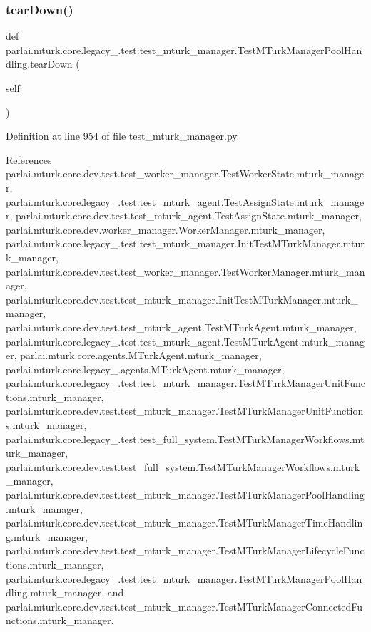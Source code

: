\subsubsection{\texorpdfstring{tear\+Down()}{tearDown()}}
{\footnotesize\ttfamily def parlai.\+mturk.\+core.\+legacy\+\_.\+test.\+test\+\_\+mturk\+\_\+manager.\+Test\+M\+Turk\+Manager\+Pool\+Handling.\+tear\+Down (\begin{DoxyParamCaption}\item[{}]{self }\end{DoxyParamCaption})}



Definition at line 954 of file test\+\_\+mturk\+\_\+manager.\+py.



References parlai.\+mturk.\+core.\+dev.\+test.\+test\+\_\+worker\+\_\+manager.\+Test\+Worker\+State.\+mturk\+\_\+manager, parlai.\+mturk.\+core.\+legacy\+\_.\+test.\+test\+\_\+mturk\+\_\+agent.\+Test\+Assign\+State.\+mturk\+\_\+manager, parlai.\+mturk.\+core.\+dev.\+test.\+test\+\_\+mturk\+\_\+agent.\+Test\+Assign\+State.\+mturk\+\_\+manager, parlai.\+mturk.\+core.\+dev.\+worker\+\_\+manager.\+Worker\+Manager.\+mturk\+\_\+manager, parlai.\+mturk.\+core.\+legacy\+\_.\+test.\+test\+\_\+mturk\+\_\+manager.\+Init\+Test\+M\+Turk\+Manager.\+mturk\+\_\+manager, parlai.\+mturk.\+core.\+dev.\+test.\+test\+\_\+worker\+\_\+manager.\+Test\+Worker\+Manager.\+mturk\+\_\+manager, parlai.\+mturk.\+core.\+dev.\+test.\+test\+\_\+mturk\+\_\+manager.\+Init\+Test\+M\+Turk\+Manager.\+mturk\+\_\+manager, parlai.\+mturk.\+core.\+dev.\+test.\+test\+\_\+mturk\+\_\+agent.\+Test\+M\+Turk\+Agent.\+mturk\+\_\+manager, parlai.\+mturk.\+core.\+legacy\+\_.\+test.\+test\+\_\+mturk\+\_\+agent.\+Test\+M\+Turk\+Agent.\+mturk\+\_\+manager, parlai.\+mturk.\+core.\+agents.\+M\+Turk\+Agent.\+mturk\+\_\+manager, parlai.\+mturk.\+core.\+legacy\+\_.\+agents.\+M\+Turk\+Agent.\+mturk\+\_\+manager, parlai.\+mturk.\+core.\+legacy\+\_.\+test.\+test\+\_\+mturk\+\_\+manager.\+Test\+M\+Turk\+Manager\+Unit\+Functions.\+mturk\+\_\+manager, parlai.\+mturk.\+core.\+dev.\+test.\+test\+\_\+mturk\+\_\+manager.\+Test\+M\+Turk\+Manager\+Unit\+Functions.\+mturk\+\_\+manager, parlai.\+mturk.\+core.\+legacy\+\_.\+test.\+test\+\_\+full\+\_\+system.\+Test\+M\+Turk\+Manager\+Workflows.\+mturk\+\_\+manager, parlai.\+mturk.\+core.\+dev.\+test.\+test\+\_\+full\+\_\+system.\+Test\+M\+Turk\+Manager\+Workflows.\+mturk\+\_\+manager, parlai.\+mturk.\+core.\+dev.\+test.\+test\+\_\+mturk\+\_\+manager.\+Test\+M\+Turk\+Manager\+Pool\+Handling.\+mturk\+\_\+manager, parlai.\+mturk.\+core.\+dev.\+test.\+test\+\_\+mturk\+\_\+manager.\+Test\+M\+Turk\+Manager\+Time\+Handling.\+mturk\+\_\+manager, parlai.\+mturk.\+core.\+dev.\+test.\+test\+\_\+mturk\+\_\+manager.\+Test\+M\+Turk\+Manager\+Lifecycle\+Functions.\+mturk\+\_\+manager, parlai.\+mturk.\+core.\+legacy\+\_.\+test.\+test\+\_\+mturk\+\_\+manager.\+Test\+M\+Turk\+Manager\+Pool\+Handling.\+mturk\+\_\+manager, and parlai.\+mturk.\+core.\+dev.\+test.\+test\+\_\+mturk\+\_\+manager.\+Test\+M\+Turk\+Manager\+Connected\+Functions.\+mturk\+\_\+manager.

